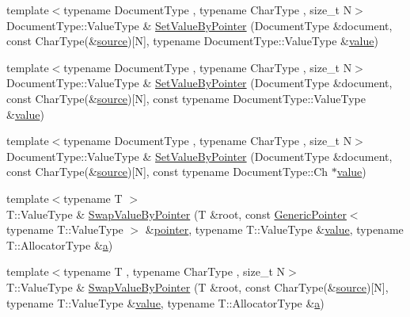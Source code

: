 \begin{DoxyCompactItemize}
{\footnotesize template$<$typename Document\+Type , typename Char\+Type , size\+\_\+t N$>$ }\\Document\+Type\+::\+Value\+Type \& \mbox{\hyperlink{namespacerapidjson_aa4a6b91e9ba841920a3eebf7966219ec}{Set\+Value\+By\+Pointer}} (Document\+Type \&document, const Char\+Type(\&\mbox{\hyperlink{namespacerapidjson_a37a3d95ab06aa7542487bb76e704885c}{source}})\mbox{[}N\mbox{]}, typename Document\+Type\+::\+Value\+Type \&\mbox{\hyperlink{namespacerapidjson_a1a75d60792094d496b500c40776030dd}{value}})
\item 
{\footnotesize template$<$typename Document\+Type , typename Char\+Type , size\+\_\+t N$>$ }\\Document\+Type\+::\+Value\+Type \& \mbox{\hyperlink{namespacerapidjson_a903c53365983ea6b11b1e37bcd613a40}{Set\+Value\+By\+Pointer}} (Document\+Type \&document, const Char\+Type(\&\mbox{\hyperlink{namespacerapidjson_a37a3d95ab06aa7542487bb76e704885c}{source}})\mbox{[}N\mbox{]}, const typename Document\+Type\+::\+Value\+Type \&\mbox{\hyperlink{namespacerapidjson_a1a75d60792094d496b500c40776030dd}{value}})
\item 
{\footnotesize template$<$typename Document\+Type , typename Char\+Type , size\+\_\+t N$>$ }\\Document\+Type\+::\+Value\+Type \& \mbox{\hyperlink{namespacerapidjson_add1fda95f27ace1ba362b2f8ca29b6ff}{Set\+Value\+By\+Pointer}} (Document\+Type \&document, const Char\+Type(\&\mbox{\hyperlink{namespacerapidjson_a37a3d95ab06aa7542487bb76e704885c}{source}})\mbox{[}N\mbox{]}, const typename Document\+Type\+::\+Ch $\ast$\mbox{\hyperlink{namespacerapidjson_a1a75d60792094d496b500c40776030dd}{value}})
\item 
{\footnotesize template$<$typename T $>$ }\\T\+::\+Value\+Type \& \mbox{\hyperlink{namespacerapidjson_af27fbadfe9c823485374a6b426e3bf1f}{Swap\+Value\+By\+Pointer}} (T \&root, const \mbox{\hyperlink{classrapidjson_1_1_generic_pointer}{Generic\+Pointer}}$<$ typename T\+::\+Value\+Type $>$ \&\mbox{\hyperlink{namespacerapidjson_aa5b8c07c8721afe6870a0210820ea19d}{pointer}}, typename T\+::\+Value\+Type \&\mbox{\hyperlink{namespacerapidjson_a1a75d60792094d496b500c40776030dd}{value}}, typename T\+::\+Allocator\+Type \&\mbox{\hyperlink{namespacerapidjson_a11fce64e721729aaf6be4a485c78f231}{a}})
\item 
{\footnotesize template$<$typename T , typename Char\+Type , size\+\_\+t N$>$ }\\T\+::\+Value\+Type \& \mbox{\hyperlink{namespacerapidjson_a54ef9e175c0a22c8dc894dd001063b43}{Swap\+Value\+By\+Pointer}} (T \&root, const Char\+Type(\&\mbox{\hyperlink{namespacerapidjson_a37a3d95ab06aa7542487bb76e704885c}{source}})\mbox{[}N\mbox{]}, typename T\+::\+Value\+Type \&\mbox{\hyperlink{namespacerapidjson_a1a75d60792094d496b500c40776030dd}{value}}, typename T\+::\+Allocator\+Type \&\mbox{\hyperlink{namespacerapidjson_a11fce64e721729aaf6be4a485c78f231}{a}})

\end{DoxyCompactItemize}
